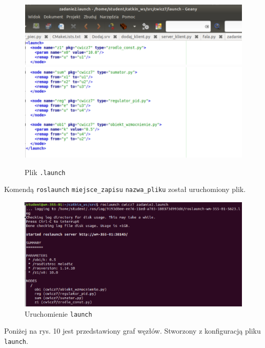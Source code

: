 \documentclass[10pt,a4paper,twoside,twocolumn]{article}%
\begin{document}
\begin{figure}[H]
    \centering
    \includegraphics[width=0.9\linewidth]{image8.png}
    \includegraphics[width=0.9\linewidth]{image9.png}
    \caption{Plik \texttt{.launch}}
\end{figure}

Komendą \texttt{roslaunch} \texttt{miejsce\_zapisu} \texttt{nazwa\_pliku} został uruchomiony plik.

\begin{figure}[H]
    \centering
    \includegraphics[width=0.9\linewidth]{image10.png}
    \caption{Uruchomienie \texttt{launch}}
\end{figure}

Poniżej na rys. 10 jest przedstawiony graf węzłów. Stworzony z konfiguracją pliku \texttt{launch}.
\end{document}
